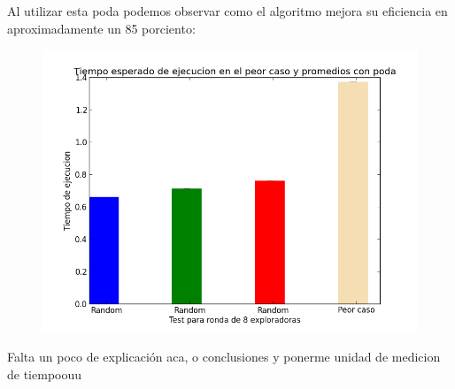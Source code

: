 \documentclass[11pt]{article}
\begin{document}
Al utilizar esta poda podemos observar como el algoritmo mejora su eficiencia en aproximadamente un 85 porciento: 

      \begin{figure}[h]
        \begin{center}
        \includegraphics[scale=0.4]{peorCaso8Conpoda}
        \end{center}
        \end{figure}


Falta un poco de explicación aca, o conclusiones y ponerme unidad de medicion de tiempoouu
\end{document}
